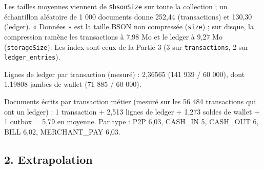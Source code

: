 \documentclass[11pt,a4paper]{article}
\begin{document}
	Les tailles moyennes viennent de \texttt{\$bsonSize} sur toute la collection ; un échantillon aléatoire de 1 000 documents donne 252,44 (transactions) et 130,30 (ledger). « Données » est la taille BSON non compressée (\texttt{size}) ; sur disque, la compression ramène les transactions à 7,98 Mo et le ledger à 9,27 Mo (\texttt{storageSize}). Les index sont ceux de la Partie 3 (3 sur \texttt{transactions}, 2 sur \texttt{ledger\_entries}).
	
	Lignes de ledger par transaction (mesuré) : 2,36565 (141 939 / 60 000), dont 1,19808 jambes de wallet (71 885 / 60 000).
	
	Documents écrits par transaction métier (mesuré sur les 56 484 transactions qui ont un ledger) : 1 transaction + 2,513 lignes de ledger + 1,273 soldes de wallet + 1 outbox = 5,79 en moyenne. Par type : P2P 6,03, CASH\_IN 5, CASH\_OUT 6, BILL 6,02, MERCHANT\_PAY 6,03.
	
	\subsection*{2. Extrapolation}
	
\end{document}
